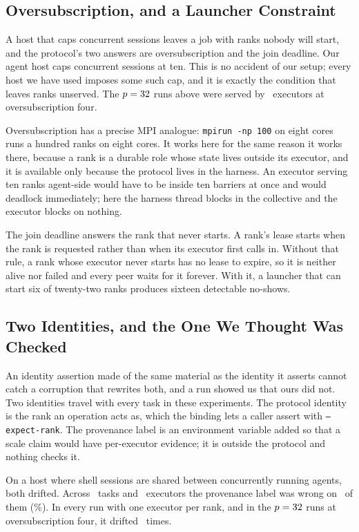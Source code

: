 \documentclass[sigconf,nonacm]{acmart}
\newcommand{\code}[1]{\texttt{\small #1}}
\begin{document}
\subsection{Oversubscription, and a Launcher Constraint}
\label{sec:eval-oversub}

A host that caps concurrent sessions leaves a job with ranks nobody will start,
and the protocol's two answers are oversubscription and the join deadline. Our
agent host caps concurrent sessions at ten. This is no accident of our setup;
every host we have used imposes some such cap, and it is exactly the condition
that leaves ranks unserved. The $p=32$ runs above were served by
\eLargeExecutors\ executors at oversubscription four.

Oversubscription has a precise MPI analogue: \code{mpirun -np 100} on eight
cores runs a hundred ranks on eight cores. It works here for the same reason it
works there, because a rank is a durable role whose state lives outside its
executor, and it is available only because the protocol lives in the harness. An
executor serving ten ranks agent-side would have to be inside ten barriers at
once and would deadlock immediately; here the harness thread blocks in the
collective and the executor blocks on nothing.

The join deadline answers the rank that never starts. A rank's lease starts
when the rank is requested rather than when its executor first calls in. Without
that rule, a rank whose executor never starts has no lease to expire, so it is
neither alive nor failed and every peer waits for it forever. With it, a launcher
that can start six of twenty-two ranks produces sixteen detectable no-shows.

\subsection{Two Identities, and the One We Thought Was Checked}
\label{sec:identity}

An identity assertion made of the same material as the identity it asserts
cannot catch a corruption that rewrites both, and a run showed us that ours did
not. Two identities travel with every task in these experiments. The protocol
identity is the rank an operation acts as, which the binding lets a caller assert
with \code{--expect-rank}. The provenance label is an environment variable added
so that a scale claim would have per-executor evidence; it is outside the
protocol and nothing checks it.

On a host where shell sessions are shared between concurrently running agents,
both drifted. Across \provTasks\ tasks and \provExecutors\ executors the
provenance label was wrong on \provDrift\ of them (\provDriftPct\%). In every run
with one executor per rank, and in the $p=32$ runs at oversubscription
four, it drifted \provSmallDrift\ times.
\end{document}
